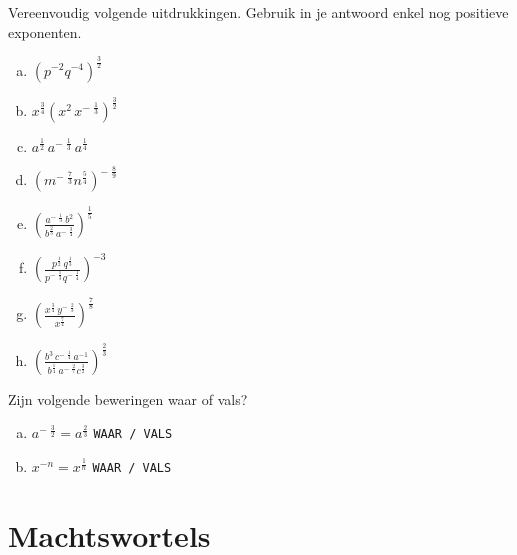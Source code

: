 \documentclass[12pt,twoside]{article}
\begin{document}
\begin{oefening}
  Vereenvoudig volgende uitdrukkingen. Gebruik in je antwoord enkel nog positieve exponenten.
  \begin{multicols}{3}
  \begin{enumerate}[(a)]
    \itemsep1em
  \item ${\left( {{p^{ - 2}}{q^{ - 4}}} \right)^{\frac{3}{2}}}$
  \item ${x^{\frac{3}{4}}}{\left( {{x^2}\,{x^{ - \,\,\frac{1}{3}}}} \right)^{\frac{3}{2}}}$
  \item ${a^{\frac{1}{2}}}\,{a^{ - \,\,\frac{1}{3}}}\,{a^{\frac{1}{4}}}$
  \item ${\left( {{m^{ - \,\,\frac{7}{3}}}{n^{\frac{5}{4}}}} \right)^{ - \,\,\frac{8}{9}}}$
  \item ${\left( { \displaystyle \frac{{{a^{ - \,\,\frac{1}{3}}}\,{b^2}}}{{{b^{\frac{2}{3}}}\,{a^{ - \,\,\frac{3}{4}}}}}} \right)^{\frac{1}{5}}}$
  \item ${\left( { \displaystyle \frac{{{p^{\frac{1}{2}}}\,{q^{\frac{1}{3}}}}}{{{p^{ - \,\,\frac{1}{3}}}{q^{ - \,\,\frac{1}{4}}}}}} \right)^{ - 3}}$
  \item ${\left( { \displaystyle \frac{{{x^{\frac{3}{4}}}\,{y^{ - \,\,\frac{2}{3}}}}}{{{x^{\frac{7}{4}}}}}} \right)^{\frac{7}{8}}}$
  \item ${\left( { \displaystyle \frac{{{b^3}\,{c^{ - \,\,\frac{1}{4}}}\,{a^{ - 1}}}}{{{b^{\frac{1}{4}}}\,{a^{ - \,\,\frac{2}{7}}}{c^{\frac{3}{2}}}}}} \right)^{\frac{2}{3}}}$
  \end{enumerate}
  \end{multicols}
\end{oefening}


\begin{oefening}
  Zijn volgende beweringen waar of vals?
  \begin{enumerate}[(a)]
    \itemsep1em
  \item ${a^{ - \,\,\frac{3}{2}}} = {a^{\frac{2}{3}}}$ \hfill \texttt{WAAR / VALS}\mbox{\hspace{5cm}}
  \item ${x^{ - n}} = {x^{\frac{1}{n}}}$ \hfill \texttt{WAAR / VALS}\mbox{\hspace{5cm}}
  \end{enumerate}
\end{oefening}

\pagebreak
\section{Machtswortels}
\end{document}
